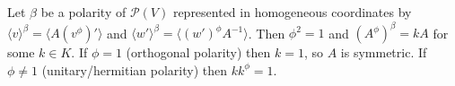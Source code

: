 Let $\beta$ be a polarity of $\mathcal{P}(V)$ represented in homogeneous coordinates by $\langle v \rangle^\beta = \langle A(v^\phi)' \rangle$ and $\langle w' \rangle^\beta = \langle (w')^\phi A^{-1} \rangle$. Then $\phi^2 = 1$ and $(A^\phi)^\beta = kA$ for some $k \in K$. If $\phi = 1$ (orthogonal polarity) then $k = 1$, so $A$ is symmetric. If $\phi \neq 1$ (unitary/hermitian polarity) then $kk^\phi = 1$.
